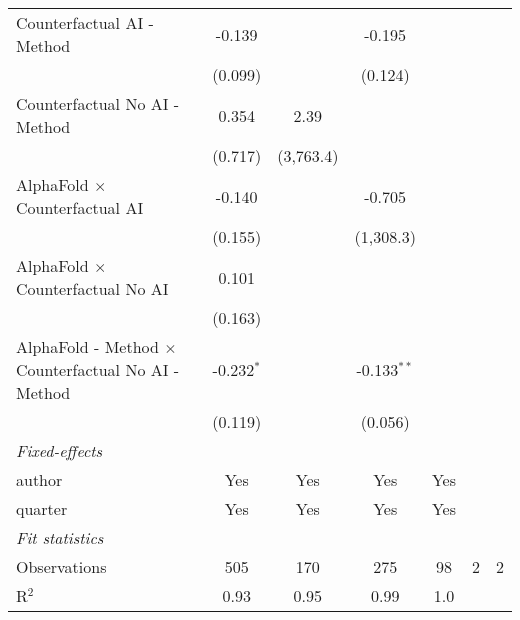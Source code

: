 \begin{tabular}{lcccccc}
   Counterfactual AI - Method                                 & -0.139       &              & -0.195        &           &     &   \\   
                                                              & (0.099)      &              & (0.124)       &           &     &   \\   
   Counterfactual No AI - Method                              & 0.354        & 2.39         &               &           &     &   \\   
                                                              & (0.717)      & (3,763.4)    &               &           &     &   \\   
   AlphaFold $\times$ Counterfactual AI                       & -0.140       &              & -0.705        &           &     &   \\   
                                                              & (0.155)      &              & (1,308.3)     &           &     &   \\   
   AlphaFold $\times$ Counterfactual No AI                    & 0.101        &              &               &           &     &   \\   
                                                              & (0.163)      &              &               &           &     &   \\   
   AlphaFold - Method $\times$ Counterfactual No AI - Method  & -0.232$^{*}$ &              & -0.133$^{**}$ &           &     &   \\   
                                                              & (0.119)      &              & (0.056)       &           &     &   \\   
   \midrule
   \emph{Fixed-effects}\\
   author                                                     & Yes          & Yes          & Yes           & Yes       &     & \\  
   quarter                                                    & Yes          & Yes          & Yes           & Yes       &     & \\  
   \midrule
   \emph{Fit statistics}\\
   Observations                                               & 505          & 170          & 275           & 98        & 2   & 2\\  
   R$^2$                                                      & 0.93         & 0.95         & 0.99          & 1.0       &     & \\  

\end{tabular}
